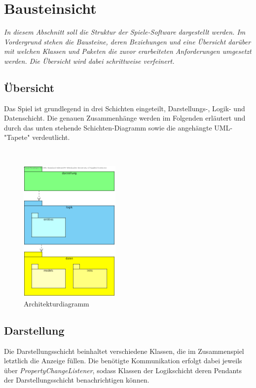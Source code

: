 \chapter{Bausteinsicht}
\textit{In diesem Abschnitt soll die Struktur der Spiele-Software dargestellt werden.
Im Vordergrund stehen die Bausteine, deren Beziehungen und eine Übersicht darüber mit welchen
Klassen und Paketen die zuvor erarbeiteten Anforderungen umgesetzt werden. Die Übersicht wird
dabei schrittweise verfeinert.}



\section{Übersicht}
Das \gls{Spiel} ist grundlegend in drei Schichten eingeteilt, Darstellungs-, Logik- und 
Datenschicht. Die genauen Zusammenhänge werden im Folgenden erläutert und durch das unten stehende 
Schichten-Diagramm sowie die angehängte UML-"Tapete" verdeutlicht.


\
\\
\begin{figure}[h]
	\begin{center}
		\includegraphics[height=7cm]{kapitel/bausteinsicht/schichten.png}
	\end{center}
	\caption{Architekturdiagramm}
	\label{fig:domain_uml}
\end{figure}



\section{Darstellung}
Die Darstellungsschicht beinhaltet verschiedene Klassen, die im Zusammenspiel letztlich die 
\gls{Anzeige} füllen. Die benötigte Kommunikation erfolgt dabei jeweils über 
\textit{PropertyChangeListener}, sodass Klassen der Logikschicht deren Pendants der 
Darstellungsschicht benachrichtigen können.

